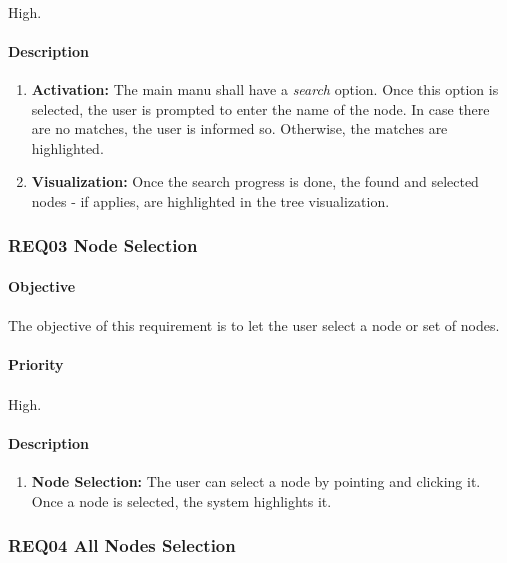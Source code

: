 \documentclass[10pt,a4paper]{article}
\begin{document}
\paragraph{}
High.
\paragraph{Description}
  \begin{enumerate}
    \item \textbf{Activation: }
	The main manu shall have a \emph{search} option. Once this option is selected, the user is prompted to enter the name of the node. In case there are no matches, the user is informed so. Otherwise, the matches are highlighted.
    \item \textbf{Visualization: }
	Once the search progress is done, the found and selected nodes - if applies, are highlighted in the tree visualization.
    \end{enumerate}

	\subsubsection{REQ03 Node Selection}
\paragraph{Objective}
\paragraph{}
The objective of this requirement is to let the user select a node or set of nodes.
\paragraph{Priority}
\paragraph{}
High.
\paragraph{Description}
  \begin{enumerate}
    \item \textbf{Node Selection: }
	The user can select a node by pointing and clicking it. Once a node is selected, the system highlights it.
    \end{enumerate}
	
	\subsubsection{REQ04 All Nodes Selection}
\end{document}

